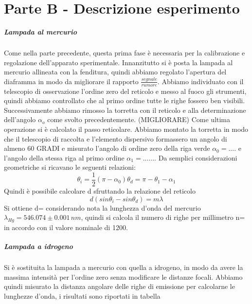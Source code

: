 \documentclass[10pt,a4paper]{article}
\begin{document}
\section{Parte B - Descrizione esperimento}
\subparagraph{Lampada al mercurio}
Come nella parte precedente, questa prima fase è necessaria per la calibrazione e regolazione dell'apparato sperimentale. Innanzitutto si è posta la lampada al mercurio allineata con la fenditura, quindi abbiamo regolato l'apertura del diaframma in modo da migliorare il rapporto $\frac{segnale}{rumore}$. Abbiamo individuato con il telescopio di osservazione l'ordine zero del reticolo e messo al fuoco gli strumenti, quindi abbiamo controllato che al primo ordine tutte le righe fossero ben visibili. Successivamente abbiamo rimosso la torretta con il reticolo e  alla determinazione dell'angolo  $\alpha_o$ come svolto precedentemente. (MIGLIORARE)
Come ultima operazione si è calcolato il passo reticolare. Abbiamo montato la torretta in modo che il telescopio di raccolta e l'elemento dispersivo formassero un angolo di almeno 60 GRADI e misurato l'angolo di ordine zero della riga verde $\alpha_0=....$ e l'angolo della stessa riga al primo ordine $\alpha_1=......$. Da semplici considerazioni geometriche si ricavano le seguenti relazioni:
\begin{equation}
\theta_i=\frac{1}{2}(\pi-\alpha_0)
\theta_d=\pi-\theta_1-\alpha_1
\end{equation}
Quindi è possibile calcolare d sfruttando la relazione del reticolo 
\begin{equation}
d(sin{\theta_i}-sin{\theta_d})=m\lambda
\end{equation}
Si ottiene d=   considerando nota la lunghezza d'onda del mercurio $\lambda_{Hg}=546.074\pm0.001\,nm$, quindi si calcola il numero di righe per millimetro n=    in accordo con il valore nominale di 1200.\\
\subparagraph{Lampada a idrogeno}
Si è sostituita la lampada a mercurio con quella a idrogeno, in modo da avere la massima intensità per l'ordine zero senza modificare le distanze focali. Abbiamo quindi misurato la distanza angolare delle righe di emissione per calcolarne le lunghezze d'onda, i risultati sono riportati in tabella
\end{document}
